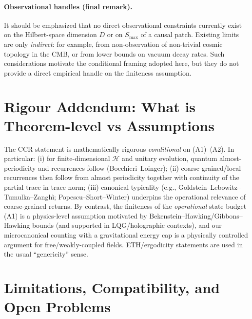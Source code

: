 \documentclass[12pt]{article}
\newcommand{\Smax}{S_{\max}}
\theoremstyle{remark}
\begin{document}
\paragraph{Observational handles (final remark).}
It should be emphasized that no direct observational constraints currently exist on the
Hilbert-space dimension $D$ or on $\Smax$ of a causal patch. Existing limits are only
\emph{indirect}: for example, from non-observation of non-trivial cosmic topology in the CMB,
or from lower bounds on vacuum decay rates. Such considerations motivate the conditional
framing adopted here, but they do not provide a direct empirical handle on the finiteness
assumption.


\section{Rigour Addendum: What is Theorem-level vs Assumptions}\label{sec:rigour-addendum}
The CCR statement is mathematically rigorous \emph{conditional} on (A1)--(A2). In particular:
(i) for finite-dimensional $\mathcal H$ and unitary evolution, quantum almost-periodicity and recurrences follow (Bocchieri--Loinger);
(ii) coarse-grained/local recurrences then follow from almost periodicity together with continuity of the partial trace in trace norm;
(iii) canonical typicality (e.g., Goldstein--Lebowitz--Tumulka--Zangh\`i; Popescu--Short--Winter) underpins the operational relevance of coarse-grained returns.
By contrast, the finiteness of the \emph{operational} state budget (A1) is a physics-level assumption motivated by Bekenstein--Hawking/Gibbons--Hawking bounds (and supported in LQG/holographic contexts), and our microcanonical counting with a gravitational energy cap is a physically controlled argument for free/weakly-coupled fields. ETH/ergodicity statements are used in the usual ``genericity'' sense.


\section{Limitations, Compatibility, and Open Problems}
\end{document}
